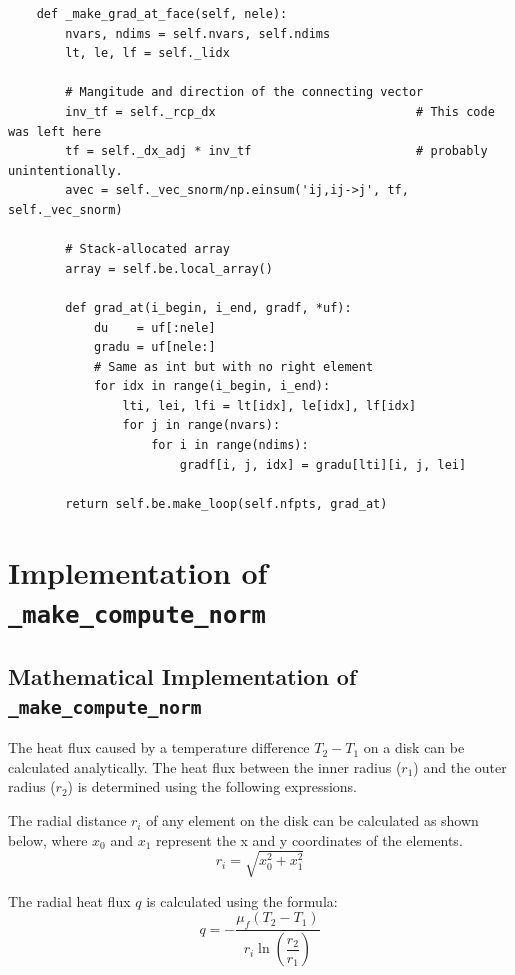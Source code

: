 \documentclass[a4paper, 12pt]{article}
\begin{document}
\begin{verbatim}
    def _make_grad_at_face(self, nele):
        nvars, ndims = self.nvars, self.ndims
        lt, le, lf = self._lidx

        # Mangitude and direction of the connecting vector
        inv_tf = self._rcp_dx                            # This code was left here
        tf = self._dx_adj * inv_tf                       # probably unintentionally.
        avec = self._vec_snorm/np.einsum('ij,ij->j', tf, self._vec_snorm)

        # Stack-allocated array
        array = self.be.local_array()

        def grad_at(i_begin, i_end, gradf, *uf):
            du    = uf[:nele]
            gradu = uf[nele:]
            # Same as int but with no right element
            for idx in range(i_begin, i_end):
                lti, lei, lfi = lt[idx], le[idx], lf[idx]
                for j in range(nvars):
                    for i in range(ndims):
                        gradf[i, j, idx] = gradu[lti][i, j, lei]

        return self.be.make_loop(self.nfpts, grad_at) 
\end{verbatim}

\section{Implementation of \texttt{\_make\_compute\_norm}}

\subsection{Mathematical Implementation of \texttt{\_make\_compute\_norm}}
The heat flux caused by a temperature difference $T_2 - T_1$ on a disk can be calculated analytically. The heat flux between the inner radius ($r_1$) and the outer radius ($r_2$) is determined using the following expressions.\\\par

The radial distance $r_i$ of any element on the disk can be calculated as shown below, where \(x_0\) and \(x_1\) represent the x and y coordinates of the elements.
\begin{equation}
    r_i = \sqrt{x_0^2 + x_1^2}
\end{equation} \par
The radial heat flux $q$ is calculated using the formula:
\begin{equation}
q = -\dfrac{\mu_f (T_2 - T_1)}{r_i \ln\left(\dfrac{r_2}{r_1}\right)}
\end{equation} \par
\end{document}
